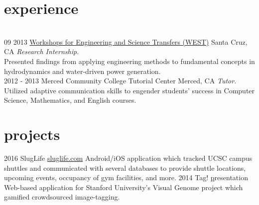 \documentclass[]{./friggeri-cv}
\begin{document}
\section{experience}
\begin{entrylist}
\\\entry
    {09 2013}
    {\href{http://isee.ucsc.edu/programs/west/index.html}{Workshops for Engineering and Science Transfers (WEST)}}
    {Santa Cruz, CA}
    {\emph{Research Internship.}\\Presented findings from applying engineering methods to fundamental concepts in hydrodynamics and water-driven power generation.}
\\\entry
    {2012 - 2013}
    {Merced Community College Tutorial Center}
    {Merced, CA}
    {\emph{Tutor.}\\Utilized adaptive communication skills to engender students' success in Computer Science, Mathematics, and English courses.}
\end{entrylist}

\section{projects}
\begin{entrylist}
  \entry
    {2016}
    {SlugLife}
    {\href{http://sluglife.com}{sluglife.com}}
    {Android/iOS application which tracked UCSC campus shuttles and
    communicated with several databases to provide shuttle locations, upcoming
    events, occupancy of gym facilities, and more.}
  \entry
    {2014}
    {Tag!}
    {\href{https://docs.google.com/presentation/d/1XygoBYkCEAtTAAr2VJopf0PE37BENOvAQkDNCBz3WPI/pub?start=false\&loop=false&delayms=3000\&slide=id.p}presentation}
    {Web-based application for Stanford University's Visual Genome project which gamified crowdsourced image-tagging.}
\end{entrylist}
\end{document}
